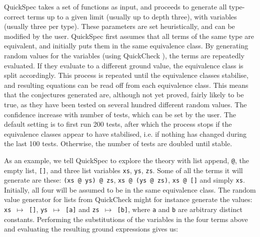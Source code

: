 QuickSpec takes a set of functions as input, and proceeds to generate all
type-correct terms up to a given limit (usually up to depth three), with
variables (usually three per type). These parameters are set heuristically, and can be modified by the user. 
QuickSpec first assumes that all terms of the same
type are equivalent, and initially puts them in the same equivalence class.  By
generating random values for the variables (using QuickCheck \cite{quickcheck}), the terms are repeatedly evaluated. If they evaluate to a different ground value, the equivalence class is split accordingly. This process is
repeated until the equivalence classes stabilise, and resulting equations can
be read off from each equivalence class.  This means that the conjectures
generated are, although not yet proved, fairly likely to be true, as they have been tested on several hundred different random values. The confidence increase with number of tests, which can be set by the user. The default setting is to first run 200 tests, after which the process stops if the equivalence classes appear to have stabilised, i.e. if nothing has changed during the last 100 tests. Otherwise, the number of tests are doubled until stable.

As an example, we tell QuickSpec to explore the theory with list append,
\verb~@~, the empty list, \verb~[]~, and three list variables \verb~xs~,
\verb~ys~, \verb~zs~. Some of all the terms it will generate are these:
\verb~(xs @ ys) @ zs~, \verb~xs @ (ys @ zs)~, \verb~xs @ []~ and simply \verb~xs~.
Initially, all four will be assumed to be in the same equivalence class.
The random value generator for lists from QuickCheck might for instance generate the values: \texttt{xs $\mapsto$ []}, \texttt{ys $\mapsto$ [a]} and \texttt{zs $\mapsto$ [b]}, where \texttt{a} and \texttt{b} are arbitrary distinct constants. Performing the substitutions of the variables in the four terms above and evaluating the resulting ground expressions gives us:


